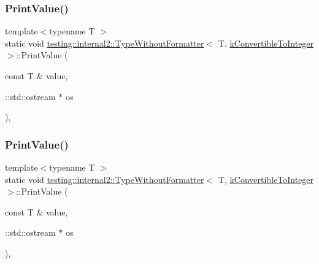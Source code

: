 \subsubsection{\texorpdfstring{PrintValue()}{PrintValue()}\hspace{0.1cm}{\footnotesize\ttfamily [1/3]}}
{\footnotesize\ttfamily template$<$typename T $>$ \\
static void \mbox{\hyperlink{classtesting_1_1internal2_1_1_type_without_formatter}{testing\+::internal2\+::\+Type\+Without\+Formatter}}$<$ T, \mbox{\hyperlink{namespacetesting_1_1internal2_aeb8161b0b3ee503347b0662d7028fd57a17045378f0cb6cac7737d414d39c720e}{k\+Convertible\+To\+Integer}} $>$\+::Print\+Value (\begin{DoxyParamCaption}\item[{const T \&}]{value,  }\item[{\+::std\+::ostream $\ast$}]{os }\end{DoxyParamCaption})\hspace{0.3cm}{\ttfamily [inline]}, {\ttfamily [static]}}

\mbox{\label{classtesting_1_1internal2_1_1_type_without_formatter_3_01_t_00_01k_convertible_to_integer_01_4_ab27a411afb608e730a57d232b3f4f486}} 
\subsubsection{\texorpdfstring{PrintValue()}{PrintValue()}\hspace{0.1cm}{\footnotesize\ttfamily [2/3]}}
{\footnotesize\ttfamily template$<$typename T $>$ \\
static void \mbox{\hyperlink{classtesting_1_1internal2_1_1_type_without_formatter}{testing\+::internal2\+::\+Type\+Without\+Formatter}}$<$ T, \mbox{\hyperlink{namespacetesting_1_1internal2_aeb8161b0b3ee503347b0662d7028fd57a17045378f0cb6cac7737d414d39c720e}{k\+Convertible\+To\+Integer}} $>$\+::Print\+Value (\begin{DoxyParamCaption}\item[{const T \&}]{value,  }\item[{\+::std\+::ostream $\ast$}]{os }\end{DoxyParamCaption})\hspace{0.3cm}{\ttfamily [inline]}, {\ttfamily [static]}}

